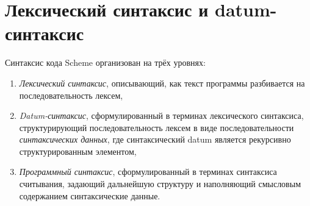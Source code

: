 \chapter{Лексический синтаксис и datum-синтаксис}
\label{readsyntaxchapter}

Синтаксис кода Scheme организован на трёх уровнях:\vspace{-3mm}
%
\begin{enumerate}
\item \textit{Лексический синтаксис}, описывающий, как текст программы разбивается на
  последовательность лексем,
\item \textit{Datum-синтаксис}, сформулированный в терминах лексического синтаксиса,
структурирующий последовательность лексем в виде последовательности \textit{синтаксических
  данных}, где
синтаксический datum является рекурсивно структурированным элементом,
\item \textit{Программный синтаксис}, сформулированный в терминах синтаксиса считывания, задающий
  дальнейшую структуру и наполняющий смысловым содержанием синтаксические данные.
\end{enumerate}\vspace{-3mm}
%
